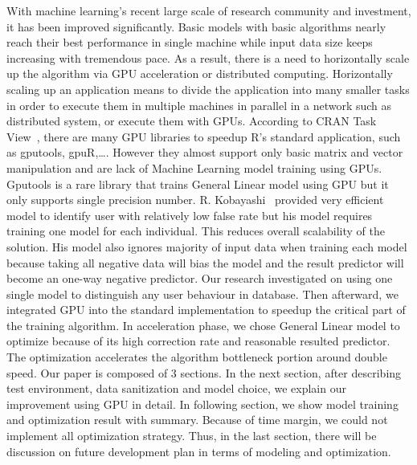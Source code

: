 \documentclass[English]{dicomopapers}
\begin{document}
  With machine learning's recent large scale of research community and investment, it has been improved significantly. Basic models with basic algorithms nearly reach their best performance in single machine while input data size keeps increasing with tremendous pace. As a result, there is a need to horizontally scale up the algorithm via GPU acceleration or distributed computing. Horizontally scaling up an application means to divide the application into many smaller tasks in order to execute them in multiple machines in parallel in a network such as distributed system, or execute them with GPUs. According to CRAN Task View~\cite{cran_task}, there are many GPU libraries to speedup R's standard application, such as gputools, gpuR,\ldots. However they almost support only basic matrix and vector manipulation and are lack of Machine Learning model training using GPUs. Gputools is a rare library that trains General Linear model using GPU but it only supports single precision number. R. Kobayashi~\cite{kobayashi1} provided very efficient model to identify user with relatively low false rate but his model requires training one model for each individual. This reduces overall scalability of the solution. His model also ignores majority of input data when training each model because taking all negative data will bias the model and the result predictor will become an one-way negative predictor.\newline
	Our research investigated on using one single model to distinguish any user behaviour in database. Then afterward, we integrated GPU into the standard implementation to speedup the critical part of the training algorithm. In acceleration phase, we chose General Linear model to optimize because of its high correction rate and reasonable resulted predictor. The optimization accelerates the algorithm bottleneck portion around double speed.\newline
	Our paper is composed of 3 sections. In the next section, after describing test environment, data sanitization and model choice, we explain our improvement using GPU in detail. In following section, we show model training and optimization result with summary. Because of time margin, we could not implement all optimization strategy. Thus, in the last section, there will be discussion on future development plan in terms of modeling and optimization.
\end{document}
